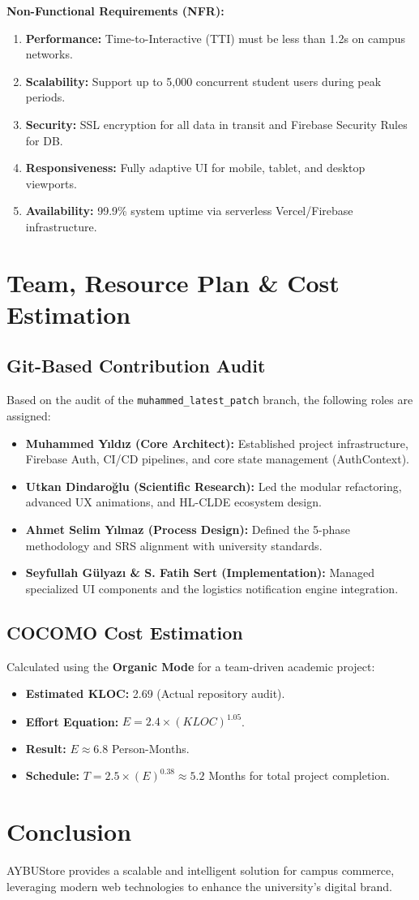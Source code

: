 \documentclass[11pt,a4paper]{article}
\begin{document}
\textbf{Non-Functional Requirements (NFR):}
\begin{enumerate}
    \item \textbf{Performance:} Time-to-Interactive (TTI) must be less than 1.2s on campus networks.
    \item \textbf{Scalability:} Support up to 5,000 concurrent student users during peak periods.
    \item \textbf{Security:} SSL encryption for all data in transit and Firebase Security Rules for DB.
    \item \textbf{Responsiveness:} Fully adaptive UI for mobile, tablet, and desktop viewports.
    \item \textbf{Availability:} 99.9\% system uptime via serverless Vercel/Firebase infrastructure.
\end{enumerate}

\section{Team, Resource Plan \& Cost Estimation}
\subsection{Git-Based Contribution Audit}
Based on the audit of the \texttt{muhammed\_latest\_patch} branch, the following roles are assigned:
\begin{itemize}
    \item \textbf{Muhammed Yıldız (Core Architect):} Established project infrastructure, Firebase Auth, CI/CD pipelines, and core state management (AuthContext).
    \item \textbf{Utkan Dindaroğlu (Scientific Research):} Led the modular refactoring, advanced UX animations, and HL-CLDE ecosystem design.
    \item \textbf{Ahmet Selim Yılmaz (Process Design):} Defined the 5-phase methodology and SRS alignment with university standards.
    \item \textbf{Seyfullah Gülyazı \& S. Fatih Sert (Implementation):} Managed specialized UI components and the logistics notification engine integration.
\end{itemize}

\subsection{COCOMO Cost Estimation}
Calculated using the \textbf{Organic Mode} for a team-driven academic project:
\begin{itemize}
    \item \textbf{Estimated KLOC:} 2.69 (Actual repository audit).
    \item \textbf{Effort Equation:} $E = 2.4 \times (KLOC)^{1.05}$.
    \item \textbf{Result:} $E \approx 6.8$ Person-Months.
    \item \textbf{Schedule:} $T = 2.5 \times (E)^{0.38} \approx 5.2$ Months for total project completion.
\end{itemize}

\section{Conclusion}
AYBUStore provides a scalable and intelligent solution for campus commerce, leveraging modern web technologies to enhance the university's digital brand.
\end{document}

